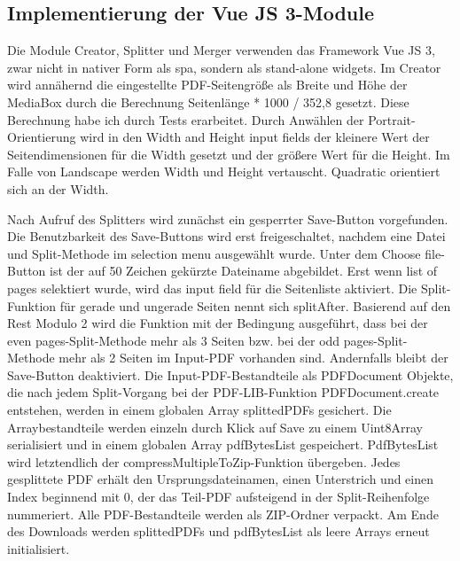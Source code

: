 \subsection{Implementierung der Vue JS 3-Module}
Die Module Creator, Splitter und Merger verwenden das Framework Vue JS 3, zwar nicht in nativer Form als \gls{spa}, sondern als stand-alone widgets. Im Creator wird annähernd die eingestellte PDF-Seitengröße als Breite und Höhe der MediaBox durch die Berechnung Seitenlänge * 1000 / 352,8 gesetzt. Diese Berechnung habe ich durch Tests erarbeitet. Durch Anwählen der Portrait-Orientierung wird in den Width and Height input fields der kleinere Wert der Seitendimensionen für die Width gesetzt und der größere Wert für die Height. Im Falle von Landscape werden Width und Height vertauscht. Quadratic orientiert sich an der Width.
\par
Nach Aufruf des Splitters wird zunächst ein gesperrter Save-Button vorgefunden. Die Benutzbarkeit des Save-Buttons wird erst freigeschaltet, nachdem eine Datei und Split-Methode im selection menu ausgewählt wurde. Unter dem Choose file-Button ist der auf 50 Zeichen gekürzte Dateiname abgebildet. Erst wenn list of pages selektiert wurde, wird das input field für die Seitenliste aktiviert. Die Split-Funktion für gerade und ungerade Seiten nennt sich splitAfter. Basierend auf den Rest Modulo 2 wird die Funktion mit der Bedingung ausgeführt, dass bei der even pages-Split-Methode mehr als 3 Seiten bzw. bei der odd pages-Split-Methode mehr als 2 Seiten im Input-PDF vorhanden sind. Andernfalls bleibt der Save-Button deaktiviert. Die Input-PDF-Bestandteile als PDFDocument Objekte, die nach jedem Split-Vorgang bei der PDF-LIB-Funktion PDFDocument.create entstehen, werden in einem globalen Array splittedPDFs gesichert. Die Arraybestandteile werden einzeln durch Klick auf Save zu einem Uint8Array serialisiert und in einem globalen Array pdfBytesList gespeichert. PdfBytesList wird letztendlich der compressMultipleToZip-Funktion übergeben. Jedes gesplittete PDF erhält den Ursprungsdateinamen, einen Unterstrich und einen Index beginnend mit 0, der das Teil-PDF aufsteigend in der Split-Reihenfolge nummeriert. Alle PDF-Bestandteile werden als ZIP-Ordner verpackt. Am Ende des Downloads werden splittedPDFs und pdfBytesList als leere Arrays erneut initialisiert.
\par
